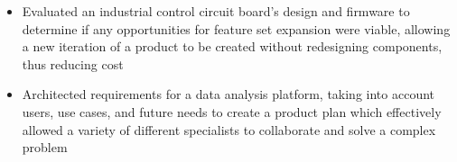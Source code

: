 \documentclass[10pt]{article}
\begin{document}
\begin{flushleft}
\begin{itemize}
		\item Evaluated an industrial control circuit board's design and firmware to determine if any opportunities for feature set expansion were viable, allowing a new iteration of a product to be created without redesigning components, thus reducing cost

		\item Architected requirements for a data analysis platform, taking into account users, use cases, and future needs to create a product plan which effectively allowed a variety of different specialists to collaborate and solve a complex problem
    \end{itemize}






\end{flushleft}
\end{document}
